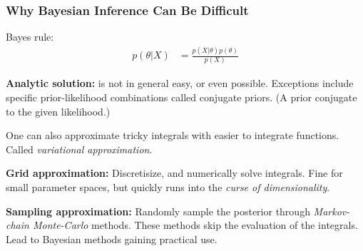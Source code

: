 \documentclass[usenames,dvipsnames,table]{beamer}
\begin{document}
\begin{frame}
\frametitle{Why Bayesian Inference Can Be Difficult}

Bayes rule:
\begin{align*}
p(\theta\vert X) &= \frac{p(X\vert \theta) p(\theta)}{p(X)}
\end{align*}

\textbf{Analytic solution:} is not in general easy, or even possible. Exceptions include specific prior-likelihood combinations called conjugate priors. (A prior conjugate to the given likelihood.)

One can also approximate tricky integrals with easier to integrate functions. Called \emph{variational approximation}.

\textbf{Grid approximation:} Discretisize, and numerically solve integrals. Fine for small parameter spaces, but quickly runs into the \emph{curse of dimensionality}.

\textbf{Sampling approximation:} Randomly sample the posterior through \emph{Markov-chain Monte-Carlo} methods. These methods skip the evaluation of the integrals. Lead to Bayesian methods gaining practical use.

\end{frame}
\end{document}
